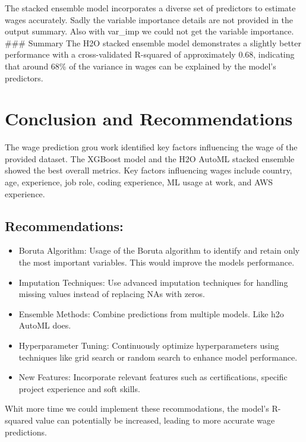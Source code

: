 \documentclass[
]{article}
\providecommand{\tightlist}{%
  \setlength{\itemsep}{0pt}\setlength{\parskip}{0pt}}
\begin{document}
The stacked ensemble model incorporates a diverse set of predictors to
estimate wages accurately. Sadly the variable importance details are not
provided in the output summary. Also with var\_imp we could not get the
variable importance. \#\#\# Summary The H2O stacked ensemble model
demonstrates a slightly better performance with a cross-validated
R-squared of approximately 0.68, indicating that around 68\% of the
variance in wages can be explained by the model's predictors.

\section{Conclusion and
Recommendations}\label{conclusion-and-recommendations}

The wage prediction grou work identified key factors influencing the
wage of the provided dataset. The XGBoost model and the H2O AutoML
stacked ensemble showed the best overall metrics. Key factors
influencing wages include country, age, experience, job role, coding
experience, ML usage at work, and AWS experience.

\subsection{Recommendations:}\label{recommendations}

\begin{itemize}
\tightlist
\item
  Boruta Algorithm: Usage of the Boruta algorithm to identify and retain
  only the most important variables. This would improve the models
  performance.
\item
  Imputation Techniques: Use advanced imputation techniques for handling
  missing values instead of replacing NAs with zeros.
\item
  Ensemble Methods: Combine predictions from multiple models. Like h2o
  AutoML does.
\item
  Hyperparameter Tuning: Continuously optimize hyperparameters using
  techniques like grid search or random search to enhance model
  performance.
\item
  New Features: Incorporate relevant features such as certifications,
  specific project experience and soft skills.
\end{itemize}

Whit more time we could implement these recommodations, the model's
R-squared value can potentially be increased, leading to more accurate
wage predictions.
\end{document}
